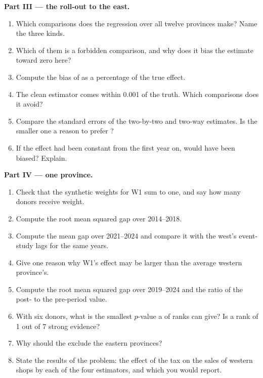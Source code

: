 \begin{problem}
\medskip\noindent\textbf{Part III --- the roll-out to the east.}
\begin{enumerate}[resume]
\item Which comparisons does the  regression over all twelve
provinces make? Name the three kinds.
\item Which of them is a forbidden comparison, and why does it bias the estimate
toward zero here?
\item Compute the bias of  as a percentage of the true effect.
\item The clean estimator comes within 0.001 of the truth. Which comparisons
does it avoid?
\item Compare the standard errors of the two-by-two and two-way estimates.
Is the smaller one a reason to prefer ?
\item If the effect had been constant from the first year on, would  have been biased? Explain.
\end{enumerate}

\medskip\noindent\textbf{Part IV --- one province.}
\begin{enumerate}[resume]
\item Check that the synthetic weights for W1 sum to one, and say how many
donors receive weight.
\item Compute the root mean squared gap over 2014--2018.
\item Compute the mean gap over 2021--2024 and compare it with the west's
event-study lags for the same years.
\item Give one reason why W1's effect may be larger than the average western
province's.
\item Compute the root mean squared gap over 2019--2024 and the ratio of the
post- to the pre-period value.
\item With six donors, what is the smallest $p$-value a  of ranks
can give? Is a rank of 1 out of 7 strong evidence?
\item Why should the  exclude the eastern provinces?
\item State the results of the problem: the effect of the tax on the sales of
western shops by each of the four estimators, and which you would report.
\end{enumerate}
\end{problem}
